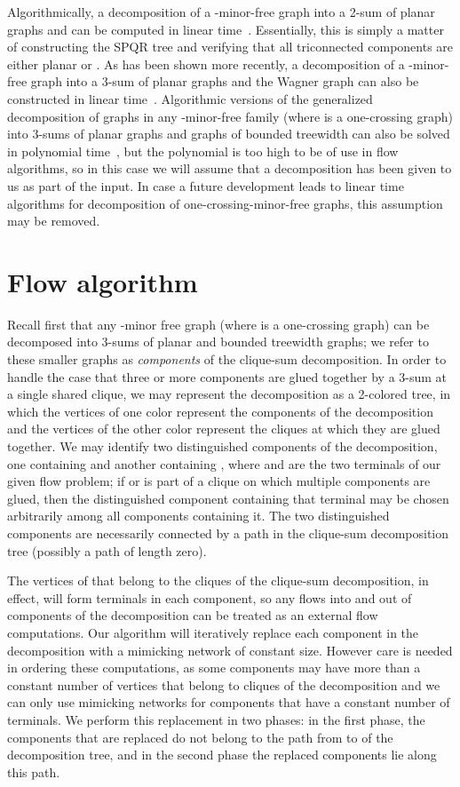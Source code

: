 \documentclass[runningheads]{llncs}
\begin{document}
Algorithmically, a decomposition of a -minor-free graph into a 2-sum of planar graphs and  can be computed in linear time~\cite{asano85}. Essentially, this is simply a matter of constructing the SPQR tree and verifying that all triconnected components are either planar or .
As has been shown more recently, a decomposition of a -minor-free graph into a 3-sum of planar graphs and the Wagner graph can also be constructed in linear time~\cite{139475,rl-ork5mfg-08}.
Algorithmic versions of the generalized decomposition of graphs in any -minor-free family (where  is a one-crossing graph) into 3-sums of planar graphs and graphs of bounded treewidth can also be solved in polynomial time~\cite{Demaine021.5-approximationfor}, but the polynomial  is too high to be of use in flow algorithms, so in this case we will assume that a decomposition has been given to us as part of the input. In case a future development leads to linear time algorithms for decomposition of one-crossing-minor-free graphs, this assumption may be removed.

\section{Flow algorithm}

Recall first that any -minor free graph  (where  is a one-crossing graph) can be decomposed into 3-sums of planar and bounded treewidth graphs; we refer to these smaller graphs as \emph{components} of the clique-sum decomposition.  In order to handle the case that three or more components are glued together by a 3-sum at a single shared clique, we may represent the decomposition as a 2-colored tree, in which the vertices of one color represent the components of the decomposition and the vertices of the other color represent the cliques at which they are glued together. We may identify two distinguished components of the decomposition, one containing  and another containing , where  and  are the two terminals of our given flow problem; if  or  is part of a clique on which multiple components are glued, then the distinguished component containing that terminal may be chosen arbitrarily among all components containing it. The two distinguished components are necessarily connected by a path in the clique-sum decomposition tree (possibly a path of length zero).

The vertices of  that belong to the cliques of the clique-sum decomposition, in effect, will form terminals in each component, so any flows into and out of components of the decomposition can be treated as an external flow computations.  Our algorithm will iteratively replace each component in the decomposition with a mimicking network of constant size.  However care is needed in ordering these computations, as some components may have more than a constant number of vertices that belong to cliques of the decomposition and we can only use mimicking networks for components that have a constant number of terminals. We perform this replacement in two phases: in the first phase, the components that are replaced do not belong to the path from  to  of the decomposition tree, and in the second phase the replaced components lie along this path.
\end{document}
